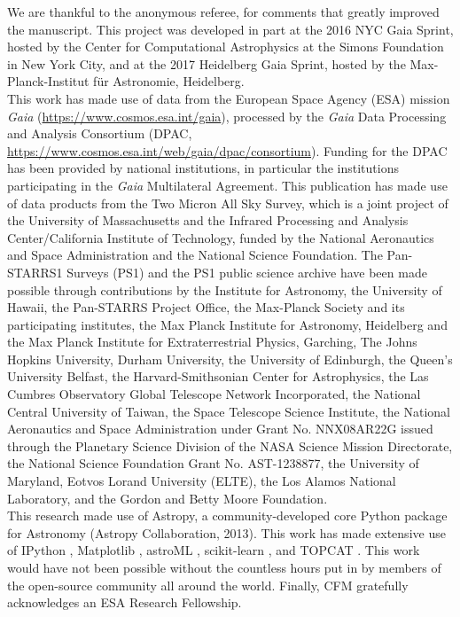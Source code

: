\documentclass[twocolumn]{aa}
\begin{document}
\begin{acknowledgements}
We are thankful to the anonymous referee, for comments that greatly improved the manuscript.
This project was developed in part at the 2016 NYC Gaia Sprint, hosted by the Center for Computational Astrophysics at the Simons Foundation in New York City, and at the 2017 Heidelberg Gaia Sprint, hosted by the Max-Planck-Institut für Astronomie, Heidelberg. \\
This work has made use of data from the European Space Agency (ESA)
mission {\it Gaia} (\url{https://www.cosmos.esa.int/gaia}), processed by
the {\it Gaia} Data Processing and Analysis Consortium (DPAC,
\url{https://www.cosmos.esa.int/web/gaia/dpac/consortium}). Funding
for the DPAC has been provided by national institutions, in particular
the institutions participating in the {\it Gaia} Multilateral Agreement.
This publication has made use of data products from the Two Micron All Sky Survey, which is a joint project of the University of Massachusetts and the Infrared Processing and Analysis Center/California Institute of Technology, funded by the National Aeronautics and Space Administration and the National Science Foundation. 
The Pan-STARRS1 Surveys (PS1) and the PS1 public science archive have been made possible through contributions by the Institute for Astronomy, the University of Hawaii, the Pan-STARRS Project Office, the Max-Planck Society and its participating institutes, the Max Planck Institute for Astronomy, Heidelberg and the Max Planck Institute for Extraterrestrial Physics, Garching, The Johns Hopkins University, Durham University, the University of Edinburgh, the Queen's University Belfast, the Harvard-Smithsonian Center for Astrophysics, the Las Cumbres Observatory Global Telescope Network Incorporated, the National Central University of Taiwan, the Space Telescope Science Institute, the National Aeronautics and Space Administration under Grant No. NNX08AR22G issued through the Planetary Science Division of the NASA Science Mission Directorate, the National Science Foundation Grant No. AST-1238877, the University of Maryland, Eotvos Lorand University (ELTE), the Los Alamos National Laboratory, and the Gordon and Betty Moore Foundation.
\\
This research made use of Astropy, a community-developed core Python package for Astronomy (Astropy Collaboration, 2013). This work has made extensive use of IPython \citep{ipython}, Matplotlib \citep{matplotlib}, astroML \citep{astroML}, scikit-learn \citep{scikit-learn}, and TOPCAT \citep[\url{http://www.star.bris.ac.uk/~mbt/topcat/}]{topcat}. This work would have not been possible without the countless hours put in by members of the open-source community all around the world.   
Finally, CFM gratefully acknowledges an ESA Research Fellowship.
\end{acknowledgements}
\end{document}

